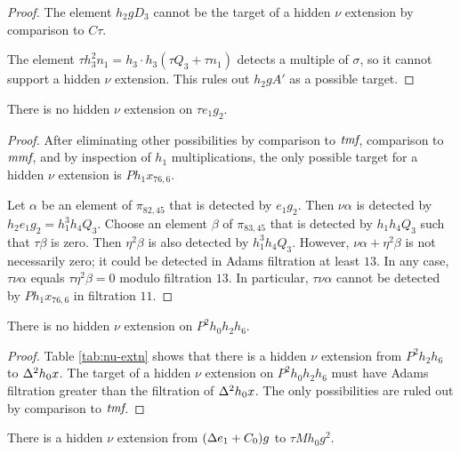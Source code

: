 \begin{proof}
The element $h_2 g D_3$ cannot be the target of a hidden
$\nu$ extension by comparison to $C\tau$.

The element $\tau h_3^2 n_1 = h_3 \cdot h_3 (\tau Q_3 + \tau n_1)$
detects a multiple of $\sigma$, so it cannot support a hidden
$\nu$ extension.  This rules out $h_2 g A'$ as a possible target.
\end{proof}

\begin{lemma}
\label{lem:nu-te1g2}
There is no hidden $\nu$ extension on $\tau e_1 g_2$.
\end{lemma}

\begin{proof}
After eliminating other possibilities by comparison to
$\textit{tmf}$, comparison to $\textit{mmf}$, and by inspection of $h_1$
multiplications, the only possible target for a hidden
$\nu$ extension is $P h_1 x_{76,6}$.  

Let $\alpha$ be an element of $\pi_{82,45}$ that is detected
by $e_1 g_2$.  Then $\nu \alpha$ is detected by
$h_2 e_1 g_2 = h_1^3 h_4 Q_3$.
Choose an element $\beta$ of $\pi_{83,45}$ that is detected
by $h_1 h_4 Q_3$ such that $\tau \beta$ is zero.
Then $\eta^2 \beta$ is also detected by $h_1^3 h_4 Q_3$.
However, $\nu \alpha + \eta^2 \beta$ is not necessarily zero; 
it could be detected in Adams filtration at least $13$.
In any case,
$\tau \nu \alpha$ equals $\tau \eta^2 \beta = 0$ modulo
filtration $13$.
In particular, $\tau \nu \alpha$ cannot be detected by
$P h_1 x_{76,6}$ in filtration $11$.
\end{proof}

\begin{lemma}
\label{lem:nu-Ph0h2h6}
There is no hidden $\nu$ extension on $P^2 h_0 h_2 h_6$.
\end{lemma}

\begin{proof}
Table \ref{tab:nu-extn} shows that there is a hidden
$\nu$ extension from $P^2 h_2 h_6$ to $\Delta^2 h_0 x$.
The target of a hidden $\nu$ extension
on $P^2 h_0 h_2 h_6$ must have Adams filtration greater than
the filtration of $\Delta^2 h_0 x$.
The only possibilities are ruled out by comparison to $\textit{tmf}$.
\end{proof}

\begin{lemma}
\label{lem:nu-(De1+C0)g}
There is a hidden $\nu$ extension
from $(\Delta e_1 + C_0) g$ to $\tau M h_0 g^2$.
\end{lemma}

